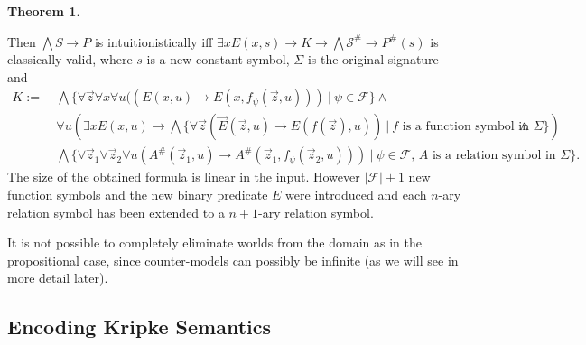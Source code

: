 \documentclass[a4paper,12pt]{report}
\theoremstyle{definition}
\newtheorem{theorem}{Theorem}[section]
\theoremstyle{definition}
\theoremstyle{definition}
\theoremstyle{definition}
\theoremstyle{definition}
\theoremstyle{definition}
\theoremstyle{definition}
\begin{document}
\begin{theorem}
\begin{itemize}
		\end{itemize}
		Then $\bigwedge S\to P$ is intuitionistically iff $\exists xE(x, s)\to K\to \bigwedge\mathcal S^\#\to P^\#(s)$ is classically valid, where $s$ is a new constant symbol, $\Sigma$ is the original signature and
		\begin{align*}
			K := &\:\bigwedge\{\forall\vec z\forall x\forall u((E(x, u)\to E(x, f_\psi(\vec z, u)))\:|\:\psi\in\mathcal F\}\wedge\\
			&\:\forall u\left(\exists xE(x, u)\to \bigwedge\{\forall\vec z(\vec E(\vec z, u)\to E(f(\vec z), u))\:|\:\text{$f$ is a function symbol in $\Sigma$}\}\right)\wedge\\
			&\:\bigwedge\{\forall\vec z_1\forall \vec z_2\forall u(A^\#(\vec z_1, u)\to A^\#(\vec z_1, f_\psi(\vec z_2, u)))\:|\:\text{$\psi\in\mathcal F$, $A$ is a relation symbol in $\Sigma$}\}.
		\end{align*}
		The size of the obtained formula is linear in the input. However $|\mathcal F| + 1$ new function symbols and the new binary predicate $E$ were introduced and each $n$-ary relation symbol has been extended to a $n+1$-ary relation symbol.
	\end{theorem}
	
	It is not possible to completely eliminate worlds from the domain as in the propositional case, since counter-models can possibly be infinite (as we will see in more detail later).
	
	\subsection{Encoding Kripke Semantics}
	
\end{document}
